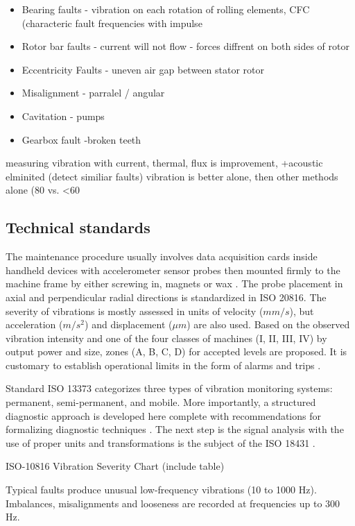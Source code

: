 \begin{itemize}
\item Bearing faults - vibration on each rotation of rolling elements, CFC (characteric fault frequencies with impulse
\item Rotor bar faults - current will not flow - forces diffrent on both sides of rotor
\item Eccentricity Faults - uneven air gap between stator rotor
\item Misalignment - parralel / angular
\item Cavitation - pumps
\item Gearbox fault -broken teeth
\end{itemize}
measuring vibration with current, thermal, flux is improvement, +acoustic elminited (detect similiar faults)
vibration is better alone, then other methods alone (80 vs. <60%
 \cite{goel_methodology_2022}

\subsection{Technical standards}
The maintenance procedure usually involves data acquisition cards inside handheld devices with accelerometer sensor probes then mounted firmly to the machine frame by either screwing in, magnets or wax \cite{ziaran_technicka_2013}. The probe placement in axial and perpendicular radial directions is standardized in ISO 20816. The severity of vibrations is mostly assessed in units of velocity ($mm/s$), but acceleration ($m/s^2$) and displacement ($\mu m$) are also used. Based on the observed vibration intensity and one of the four classes of machines (I, II, III, IV) by output power and size, zones (A, B, C, D) for accepted levels are proposed. It is customary to establish operational limits in the form of alarms and trips \cite{iso_20816}.

Standard ISO 13373 categorizes three types of vibration monitoring systems: permanent, semi-permanent, and mobile. More importantly, a structured diagnostic approach is developed here complete with recommendations for formalizing diagnostic techniques \cite{iso_13373}. The next step is the signal analysis with the use of proper units and transformations is the subject of the ISO 18431 \cite{iso_18431}.

ISO-10816 Vibration Severity Chart (include table)


Typical faults produce unusual low-frequency vibrations (10 to 1000 Hz).
Imbalances, misalignments and looseness are recorded at frequencies up to 300 Hz.

